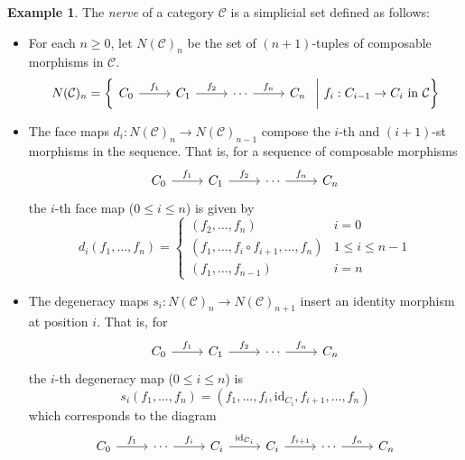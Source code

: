 \documentclass[11pt]{article}
\theoremstyle{definition}
\newtheorem{example}[definition]{Example}
\theoremstyle{plain}
\begin{document}
\begin{example}
    The \emph{nerve} of a category $\mathcal{C}$ is a simplicial set defined as follows:
    \begin{itemize}
        \item For each $n \geq 0$, let $N(\mathcal{C})_n$ be the set of $(n+1)$-tuples of composable morphisms in $\mathcal{C}$.
              \[
                  N(\mathcal{C})_n = \left\{
                  \begin{tikzcd}[column sep=2.5em,ampersand replacement=\&]
                      C_0 \arrow[r, "f_1"] \& C_1 \arrow[r, "f_2"] \& \cdots \arrow[r, "f_n"] \& C_n
                  \end{tikzcd}
                  \ \middle| \
                  f_i : C_{i-1} \to C_i \text{ in } \mathcal{C}
                  \right\}
              \]
        \item The face maps $d_i : N(\mathcal{C})_n \to N(\mathcal{C})_{n-1}$ compose the $i$-th and $(i+1)$-st morphisms in the sequence. That is, for a sequence of composable morphisms
              \[
                  \begin{tikzcd}[column sep=2.5em,ampersand replacement=\&]
                      C_0 \arrow[r, "f_1"] \& C_1 \arrow[r, "f_2"] \& \cdots \arrow[r, "f_n"] \& C_n
                  \end{tikzcd}
              \]
              the $i$-th face map ($0 \leq i \leq n$) is given by
              \[
                  d_i(f_1, \ldots, f_n) =
                  \begin{cases}
                      (f_2, \ldots, f_n)                            & i = 0             \\
                      (f_1, \ldots, f_i \circ f_{i+1}, \ldots, f_n) & 1 \leq i \leq n-1 \\
                      (f_1, \ldots, f_{n-1})                        & i = n
                  \end{cases}
              \]
        \item The degeneracy maps $s_i : N(\mathcal{C})_n \to N(\mathcal{C})_{n+1}$ insert an identity morphism at position $i$. That is, for
              \[
                  \begin{tikzcd}[column sep=2.5em,ampersand replacement=\&]
                      C_0 \arrow[r, "f_1"] \& C_1 \arrow[r, "f_2"] \& \cdots \arrow[r, "f_n"] \& C_n
                  \end{tikzcd}
              \]
              the $i$-th degeneracy map ($0 \leq i \leq n$) is
              \[
                  s_i(f_1, \ldots, f_n) = (f_1, \ldots, f_i, \mathrm{id}_{C_i}, f_{i+1}, \ldots, f_n)
              \]
              which corresponds to the diagram
              \[
                  \begin{tikzcd}[column sep=2.5em,ampersand replacement=\&]
                      C_0 \arrow[r, "f_1"] \& \cdots \arrow[r, "f_i"] \& C_i \arrow[r, "\mathrm{id}_{C_i}"] \& C_i \arrow[r, "f_{i+1}"] \& \cdots \arrow[r, "f_n"] \& C_n
                  \end{tikzcd}
              \]


\end{itemize}
\end{example}
\end{document}
